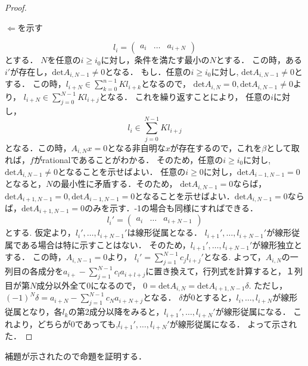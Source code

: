 \documentclass{ujarticle}
\begin{document}
\begin{proof}
\begin{description}
  \item[$\Leftarrow$を示す]
\end{description}
\begin{equation*}
  l_i=
  \begin{pmatrix}
  a_i  & \dots  &  a_{i+N}
  \end{pmatrix}
\end{equation*}
とする．
$N$を任意の$i \ge i_0$に対し，条件を満たす最小の$N$とする．
この時，ある$i'$が存在し，$\mathrm{det}A_{i,N-1} \neq 0$となる．
もし．任意の$i \ge i_0$に対し,
$\mathrm{det}A_{i,N-1} \neq 0$とする．
この時，$l_{i+N} \in \sum_{k=0}^{n-1} Kl_{i+k}$となるので，
$\mathrm{det}A_{i,N}=0,\mathrm{det}A_{i,N-1} \neq 0$より，
$l_{i+N} \in \sum_{j=0}^{N-1} Kl_{i+j}$となる．
これを繰り返すことにより，
任意の$i$に対し，
\begin{equation*}
 l_i \in \sum _{j=0}^{N-1}Kl_{i+j}
\end{equation*}
となる．この時，$A_{i,N}x=0$となる非自明な$x$が存在するので，これを$\beta$として取れば，$f$がrationalであることがわかる．
そのため，任意の$i \ge i_0$に対し,
$\mathrm{det}A_{i,N-1} \neq 0$となることを示せばよい．
任意の$i \ge 0$に対し，$\mathrm{det}A_{i-1,N-1} = 0$となると，$N$の最小性に矛盾する．そのため，
$\mathrm{det}A_{i,N-1} = 0$ならば，
$\mathrm{det}A_{i+1,N-1} = 0,\mathrm{det}A_{i-1,N-1} = 0$となることを示せばよい．$\mathrm{det}A_{i,N-1} = 0$ならば，$\mathrm{det}A_{i+1,N-1} = 0$のみを示す．-1の場合も同様にすればできる．
\begin{equation*}
  l_i'=
  \begin{pmatrix}
  a_i  & \dots  &  a_{i+N-1}
  \end{pmatrix}
\end{equation*}
とする.
仮定より，$l_i' ,\dots ,l_{i+N-1}'$は線形従属となる．
$l_{i+1}' ,\dots, l_{i+N-1}'$が線形従属である場合は特に示すことはない．
そのため，$l_{i+1}', \dots ,l_{i+N-1}'$が線形独立とする．
この時，$A_{i,N-1}=0$より，
$l_i'= \sum_{j=1}^{N-1}c_jl_{i+j}'$となる.
よって，$A_{i,N}$の一列目の各成分を$a_{i+} - \sum_{j=1}^{N-1}c_la_{i+l+j}$に置き換えて，行列式を計算すると，１列目が第$N$成分以外全て0になるので，
$0=\mathrm{det}A_{i,N}=\mathrm{det}A_{i+1,N-1}\delta$.
ただし，$(-1)^N\delta=a_{i+N} - \sum_{j=1}^{N-1}c_Na_{i+N+j}$となる．
$\delta$が0とすると，$l_i,\dots, l_{i+N}$が線形従属となり，各$l_k$の第2成分以降をみると，$l_{i+1}', \dots, l_{i+N}'$が線形従属になる．
これより，どちらが$0$であっても,$l_{i+1}' ,\dots, l_{i+N}'$が線形従属になる．
よって示された．

\end{proof}
補題が示されたので命題を証明する．
\end{document}
